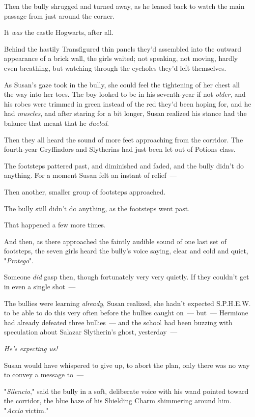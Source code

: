 Then the bully shrugged and turned away, as he leaned back to watch the main
passage from just around the corner.

It \emph{was} the castle Hogwarts, after all.

Behind the hastily Transfigured thin panels they'd assembled into the outward
appearance of a brick wall, the girls waited; not speaking, not moving, hardly
even breathing, but watching through the eyeholes they'd left themselves.

As Susan's gaze took in the bully, she could feel the tightening of her chest
all the way into her toes. The boy looked to be in his seventh-year if not
\emph{older}, and his robes were trimmed in green instead of the red they'd
been hoping for, and he had \emph{muscles}, and after staring for a bit longer,
Susan realized his stance had the balance that meant that he \emph{dueled}.

Then they all heard the sound of more feet approaching from the corridor. The
fourth-year Gryffindors and Slytherins had just been let out of Potions class.

The footsteps pattered past, and diminished and faded, and the bully didn't do
anything. For a moment Susan felt an instant of relief~---

Then another, smaller group of footsteps approached.

The bully still didn't do anything, as the footsteps went past.

That happened a few more times.

And then, as there approached the faintly audible sound of one last set of
footsteps, the seven girls heard the bully's voice saying, clear and cold and
quiet, "\emph{Protego}".

Someone \emph{did} gasp then, though fortunately very very quietly. If they
couldn't get in even a single shot~---

The bullies were learning \emph{already}, Susan realized, she hadn't expected
S.P.H.E.W. to be able to do this very often before the bullies caught
on~--- but~--- Hermione had already defeated three bullies~--- and the school had
been buzzing with speculation about Salazar Slytherin's ghost, yesterday~---

\emph{He's expecting us!}

Susan would have whispered to give up, to abort the plan, only there was no way
to convey a message to~---

"\emph{Silencio}," said the bully in a soft, deliberate voice with his wand
pointed toward the corridor, the blue haze of his Shielding Charm shimmering
around him. "\emph{Accio} victim."

